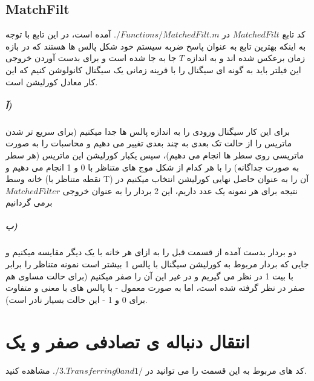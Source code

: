 \documentclass[a4paper,12pt]{article}
\begin{document}
\subsection{MatchFilt}
کد تابع $MatchedFilt$ در $./Functions/MatchedFilt.m$ آمده است، در این تابع با توجه به اینکه بهترین تابع به عنوان پاسخ ضربه سیستم خود شکل پالس ها هستند که در بازه زمان برعکس شده اند و به اندازه $T$ جا به جا شده است و برای بدست آوردن خروجی این فیلتر باید به گونه ای سیگنال را با قرینه زمانی یک سیگنال کانولوشن کنیم که این کار معادل کورلیشن است.
\\
\subparagraph{آ)}
برای این کار سیگنال ورودی را به اندازه پالس ها جدا میکنیم (برای سریع تر شدن ماتریس را از حالت تک بعدی به چند بعدی تغییر می دهیم و محاسبات را به صورت ماتریسی روی سطر ها انجام می دهیم)، سپس یکبار کورلیشن این ماتریس (هر سطر به صورت جداگانه) را با هر کدام از شکل موج های متناظر با 0 و 1 انجام می دهیم و خانه وسط (نقطه متناظر با T) آن را به عنوان حاصل نهایی کورلیشن انتخاب میکنیم در نتیجه برای هر نمونه یک عدد داریم، این 2 بردار را به عنوان خروجی $MatchedFilter$ برمی گردانیم
\\
\subparagraph{ب)}
دو بردار بدست آمده از قسمت قبل را به ازای هر خانه با یک دیگر مقایسه میکنیم و جایی که بردار مربوط به کورلیشن سیگنال با پالس 1 بیشتر است نمونه متناظر را برابر با بیت 1 در نظر می گیریم و در غیر این آن را صفر میکنیم (برای حالت مساوی هم صفر در نظر گرفته شده است، اما به صورت معمول - با پالس های با معنی و متفاوت برای 0 و 1 - این حالت بسیار نادر است).
\\
\clearpage
\section{انتقال دنباله ی تصادفی صفر و یک}
کد های مربوط به این قسمت را می توانید در $./3.Transferring0and1/$ مشاهده کنید.
\end{document}
